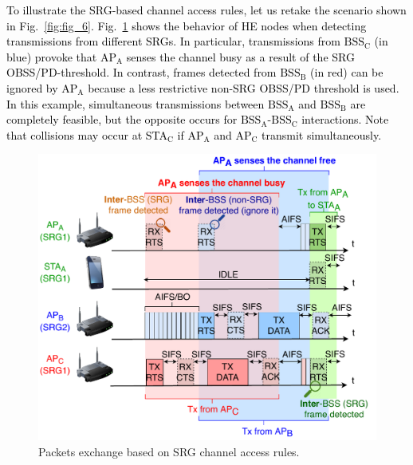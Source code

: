 \documentclass{ieeeaccess}
\begin{document}
\textcolor{black}{To illustrate the SRG-based channel access rules, let us retake the scenario shown in Fig.~\ref{fig:fig_6}. Fig.~\ref{fig:srg_channel_access} shows the behavior of HE nodes when detecting transmissions from different SRGs. In particular, transmissions from $\text{BSS}_\text{C}$ (in blue) provoke that $\text{AP}_\text{A}$ senses the channel busy as a result of the SRG OBSS/PD-threshold. In contrast, frames detected from $\text{BSS}_\text{B}$ (in red) can be ignored by $\text{AP}_\text{A}$ because a less restrictive non-SRG OBSS/PD threshold is used. In this example, simultaneous transmissions between $\text{BSS}_\text{A}$ and $\text{BSS}_\text{B}$ are completely feasible, but the opposite occurs for $\text{BSS}_\text{A}$-$\text{BSS}_\text{C}$ interactions. Note that collisions may occur at STA$_\text{C}$ if $\text{AP}_\text{A}$ and $\text{AP}_\text{C}$ transmit simultaneously.}
\begin{figure}[ht!]
	\centering
	\includegraphics[width=\columnwidth]{fig_7}
	\caption{Packets exchange based on SRG channel access rules.}
	\label{fig:srg_channel_access}
\end{figure} 

\end{document}
